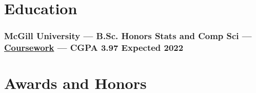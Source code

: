 \documentclass{article}
\begin{document}




% 

\section{Education\hfill\normalsize }

\subsubsection{McGill University --- B.Sc. Honors Stats and Comp Sci --- \href{https://colekillian.com/coursework-overview}{Coursework} --- CGPA 3.97 \hfill Expected 2022}


\section{Awards and Honors}
\end{document}
